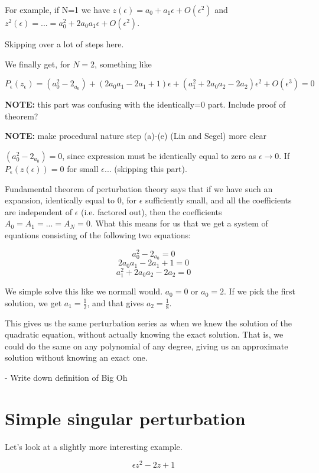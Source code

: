 \documentclass[12pt]{report}
\begin{document}
For example, if N=1 we have $z(\epsilon) = a_0 + a_1\epsilon +
O(\epsilon^2)$ and $z^2(\epsilon) = ... = a_0^2 + 2 a_0 a_1 \epsilon +
O(\epsilon^2)$.

Skipping over a lot of steps here.

We finally get, for $N=2$, something like

$$P_\epsilon(z_\epsilon) = (a_0^2 - 2_{a_0}) + (2 a_0 a_1 - 2 a_1 +1)\epsilon + (a_1^2 + 2 a_0 a_2 -
2 a_2)\epsilon^2 + O(\epsilon^3) = 0$$

\textbf{NOTE:} this part was confusing with the identically=0 part. Include proof of theorem?

\textbf{NOTE:} make procedural nature step (a)-(e) (Lin and Segel) more clear

$(a_0^2 - 2_{a_0}) = 0$, since expression must be identically equal to zero as
$\epsilon \to 0$. If $P_\epsilon(z(\epsilon)) = 0$ for small $\epsilon$... (skipping this part).

Fundamental theorem of perturbation theory says that if we have such an
expansion, identically equal to 0, for $\epsilon$ sufficiently small, and all
the coefficients are independent of $\epsilon$ (i.e. factored out), then the
coefficients $A_0 = A_1 = ... = A_N = 0$. What this means for us that we get a
system of equations consisting of the following two equations:

$$ a_0^2 - 2_{a_0} = 0$$
$$ 2 a_0 a_1 - 2 a_1 +1 = 0 $$
$$ a_1^2 + 2 a_0 a_2 -2 a_2 = 0$$

We simple solve this like we normall would. $a_0 = 0$ or $a_0 = 2$. If
we pick the first solution, we get $a_1=\frac 1 2$, and that gives
$a_2 = \frac 1 8$.

This gives us the same perturbation series as when we knew the
solution of the quadratic equation, without actually knowing the exact
solution. That is, we could do the same on any polynomial of any
degree, giving us an approximate solution without knowing an exact
one.


- Write down definition of Big Oh

\section{Simple singular perturbation}

Let's look at a slightly more interesting example.

\begin{equation}
  \epsilon z^2 - 2z + 1
\end{equation}
\end{document}

